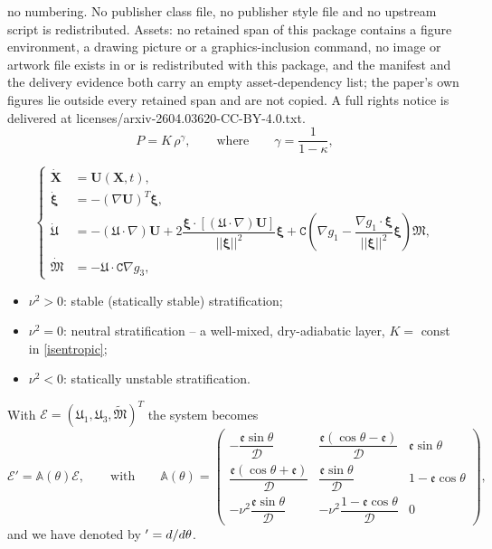\documentclass[10pt,a4paper]{amsart}
\newcommand{\cs}{\texttt{C}}
\newcommand{\A}{\boldsymbol{\mathfrak{U}}}              %
\newcommand{\B}{{\mathfrak{M}}}
\newcommand{\x}{\mathbf{X}}              %
\newcommand{\D}{\mathcal{D}}
\newcommand{\ee}{\mathfrak{e}}
\newcommand{\bu}{\mathbf{U}}             %
\begin{document}
no numbering. No publisher class file, no publisher style file and no upstream script is redistributed. Assets: no retained span of this package contains a figure environment, a drawing picture or a graphics-inclusion command, no image or artwork file exists in or is redistributed with this package, and the manifest and the delivery evidence both carry an empty asset-dependency list; the paper's own figures lie outside every retained span and are not copied. A full rights notice is delivered at licenses/arxiv-2604.03620-CC-BY-4.0.txt.
\setcounter{equation}{14}
\begin{equation}\label{isentropic}
   P=K\,\rho^\gamma, \qquad\text{where} \qquad \gamma=\frac{1}{1-\kappa},
\end{equation}

\setcounter{equation}{27}
  \begin{equation}\label{leading order}
   \left \{\begin{aligned}
    \dot{\x}&=\bu(\x,t),\\
     \dot{\boldsymbol{\xi}}& =-(\nabla\bu)^T\boldsymbol{\xi}, \\  
    \dot{\A}&=-(\A\cdot\nabla)\bu+2\dfrac{\boldsymbol{\xi}\cdot[(\A\cdot\nabla)\bu]}{||\boldsymbol{\xi}||^2}\boldsymbol{\xi}+\cs\left(\nabla g_1-\dfrac{\nabla g_1\cdot\boldsymbol{\xi}}{||\boldsymbol{\xi}||^2}\boldsymbol{\xi}\right)\B, \\
       \dot{\B}&=-\A\cdot\cs \nabla g_3 ,
       \end{aligned} \right.
\end{equation}

\setcounter{equation}{39}
\begin{itemize}
\item $\nu^2>0$: stable (statically stable) stratification;
\item $\nu^2=0$: neutral stratification -- a well-mixed, dry-adiabatic layer, $K=$ const in \eqref{isentropic};
\item $\nu^2<0$: statically unstable stratification.
\end{itemize}
With $\boldsymbol{\mathcal E}=(\mathfrak{U}_1,\mathfrak{U}_3,\widetilde{\B})^T$ the system becomes
\begin{equation}\label{eq:Asys}
\boldsymbol{\mathcal E}'=\mathbb A(\theta)\boldsymbol{\mathcal E},\qquad\text{with}\qquad
\mathbb A(\theta)=
\begin{pmatrix}
-\dfrac{\ee\sin\theta}{\D} & \dfrac{\ee(\cos\theta-\ee)}{\D} & \ee\sin\theta\\[1.2ex]
\dfrac{\ee(\cos\theta+\ee)}{\D} & \dfrac{\ee\sin\theta}{\D} & 1-\ee\cos\theta\\[1.2ex]
-\nu^2\dfrac{\ee\sin\theta}{\D} & -\nu^2\dfrac{1-\ee\cos\theta}{\D} & 0
\end{pmatrix},
\end{equation}
and we have denoted by $'={\rm d}/{\rm d}\theta$.
\end{document}
